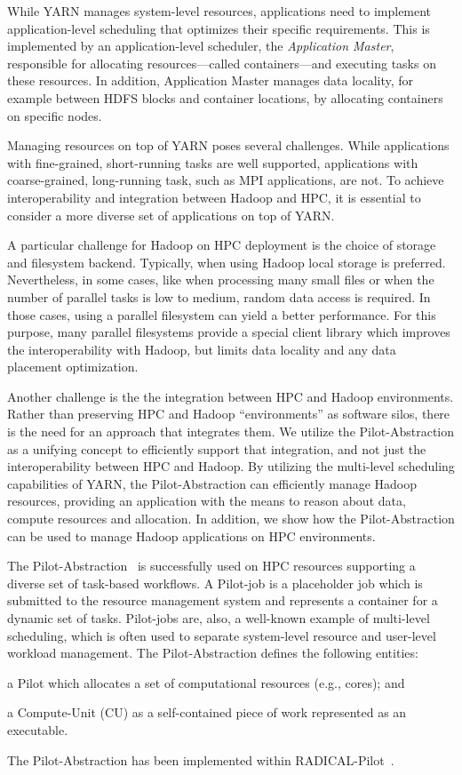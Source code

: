 While YARN manages system-level resources, applications need to implement
application-level scheduling that optimizes their specific requirements. This is
implemented by an application-level scheduler, the \textit{Application Master},
responsible for allocating resources---called containers---and executing tasks
on these resources. In addition, Application Master manages data locality, for
example between HDFS blocks and container locations, by allocating containers on
specific nodes.

Managing resources on top of YARN poses several challenges. While applications
with fine-grained, short-running tasks are well supported, applications with
coarse-grained, long-running task, such as MPI applications, are not. To achieve
interoperability and integration between Hadoop and HPC, it is essential to
consider a more diverse set of applications on top of YARN.

A particular challenge for Hadoop on HPC deployment is the choice of storage and
filesystem backend. Typically, when using Hadoop local storage is preferred.
Nevertheless, in some cases, like when processing many small files or when
the number of parallel tasks is low to medium, random data access is required.
In those cases, using a parallel filesystem can yield a better performance. For
this purpose, many parallel filesystems provide a special client library which
improves the interoperability with Hadoop, but limits data locality and any data
placement optimization.

Another challenge is the the integration between HPC and Hadoop environments.
Rather than preserving HPC and Hadoop ``environments'' as software silos, there
is the need for an approach that integrates them. We utilize the
Pilot-Abstraction as a unifying concept to efficiently support that integration,
and not just the interoperability between HPC and Hadoop. By utilizing the
multi-level scheduling capabilities of YARN, the Pilot-Abstraction can
efficiently manage Hadoop resources, providing an application with the means to
reason about data, compute resources and allocation. In addition, we show how
the Pilot-Abstraction can be used to manage Hadoop applications on HPC
environments.

The Pilot-Abstraction~\cite{luckow2012pstar} is successfully used on HPC
resources supporting a diverse set of task-based workflows. A Pilot-job is a
placeholder job which is submitted to the resource management system and
represents a container for a dynamic set of tasks. Pilot-jobs are, also, a
well-known example of multi-level scheduling, which is often used to separate
system-level resource and user-level workload management. The Pilot-Abstraction
defines the following entities:
\begin{inparaenum} [1)]
    \item a Pilot which allocates a set of computational resources (e.g.,
    cores); and
    \item  a Compute-Unit (CU) as a self-contained piece of work represented as
    an executable.
\end{inparaenum}
The Pilot-Abstraction has been implemented within
RADICAL-Pilot~\cite{merzky2018design}.


